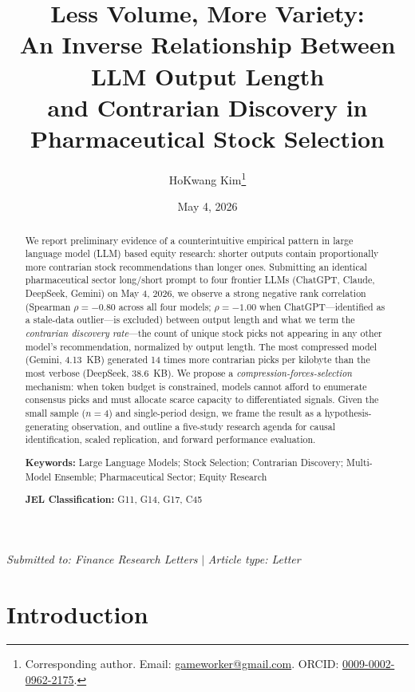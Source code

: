\documentclass[11pt,letterpaper]{article}
\title{\textbf{Less Volume, More Variety:\\[2pt]
\large An Inverse Relationship Between LLM Output Length\\
and Contrarian Discovery in Pharmaceutical Stock Selection}}
\author[1]{HoKwang Kim\thanks{Corresponding author. Email: \href{mailto:gameworker@gmail.com}{gameworker@gmail.com}. ORCID: \href{https://orcid.org/0009-0002-0962-2175}{0009-0002-0962-2175}.}}
\affil[1]{Betalabs Inc., Seoul, Republic of Korea}
\date{May 4, 2026}
\begin{document}
\maketitle

\thispagestyle{empty}

\vspace{1em}
\begin{center}
\textit{Submitted to: Finance Research Letters} \quad $|$ \quad \textit{Article type: Letter}
\end{center}

\begin{abstract}
\noindent
We report preliminary evidence of a counterintuitive empirical pattern in large language model (LLM) based equity research: shorter outputs contain proportionally more contrarian stock recommendations than longer ones. Submitting an identical pharmaceutical sector long/short prompt to four frontier LLMs (ChatGPT, Claude, DeepSeek, Gemini) on May 4, 2026, we observe a strong negative rank correlation (Spearman $\rho=-0.80$ across all four models; $\rho=-1.00$ when ChatGPT---identified as a stale-data outlier---is excluded) between output length and what we term the \textit{contrarian discovery rate}---the count of unique stock picks not appearing in any other model's recommendation, normalized by output length. The most compressed model (Gemini, 4.13~KB) generated 14 times more contrarian picks per kilobyte than the most verbose (DeepSeek, 38.6~KB). We propose a \textit{compression-forces-selection} mechanism: when token budget is constrained, models cannot afford to enumerate consensus picks and must allocate scarce capacity to differentiated signals. Given the small sample ($n=4$) and single-period design, we frame the result as a hypothesis-generating observation, and outline a five-study research agenda for causal identification, scaled replication, and forward performance evaluation.

\vspace{0.5em}
\noindent\textbf{Keywords:} Large Language Models; Stock Selection; Contrarian Discovery; Multi-Model Ensemble; Pharmaceutical Sector; Equity Research

\noindent\textbf{JEL Classification:} G11, G14, G17, C45
\end{abstract}

\section{Introduction}
\end{document}
